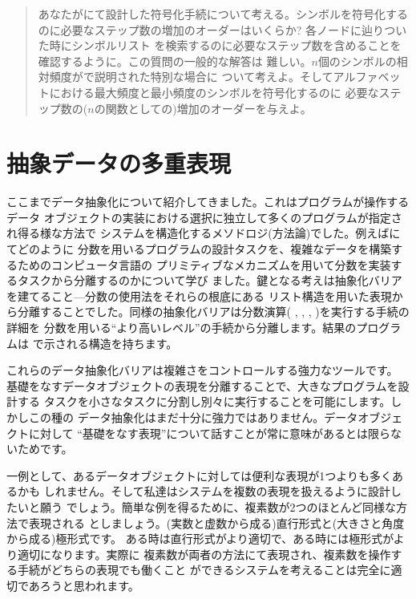 \begin{quote}
あなたがにて設計した符号化手続について考える。シンボルを符号化する
のに必要なステップ数の増加のオーダーはいくらか? 各ノードに辿りついた時にシンボルリスト
を検索するのに必要なステップ数を含めることを確認するように。この質問の一般的な解答は
難しい。\( n \)個のシンボルの相対頻度がで説明された特別な場合に
ついて考えよ。そしてアルファベットにおける最大頻度と最小頻度のシンボルを符号化するのに
必要なステップ数の(\( n \)の関数としての)増加のオーダーを与えよ。
\end{quote}

\section{抽象データの多重表現}
\label{Section 2.4}

ここまでデータ抽象化について紹介してきました。これはプログラムが操作するデータ
オブジェクトの実装における選択に独立して多くのプログラムが指定され得る様な方法で
システムを構造化するメソドロジ(方法論)でした。例えばにてどのように
分数を用いるプログラムの設計タスクを、複雑なデータを構築するためのコンピュータ言語の
プリミティブなメカニズムを用いて分数を実装するタスクから分離するのかについて学び
ました。鍵となる考えは抽象化バリアを建てること---分数の使用法をそれらの根底にある
リスト構造を用いた表現から分離することでした。同様の抽象化バリアは分数演算(
, , , )を実行する手続の詳細を
分数を用いる``より高いレベル''の手続から分離します。結果のプログラムは
で示される構造を持ちます。

これらのデータ抽象化バリアは複雑さをコントロールする強力なツールです。
基礎をなすデータオブジェクトの表現を分離することで、大きなプログラムを設計する
タスクを小さなタスクに分割し別々に実行することを可能にします。しかしこの種の
データ抽象化はまだ十分に強力ではありません。データオブジェクトに対して
``基礎をなす表現''について話すことが常に意味があるとは限らないためです。



一例として、あるデータオブジェクトに対しては便利な表現が1つよりも多くあるかも
しれません。そして私達はシステムを複数の表現を扱えるように設計したいと願う
でしょう。簡単な例を得るために、複素数が2つのほとんど同様な方法で表現される
としましょう。(実数と虚数から成る)直行形式と(大きさと角度から成る)極形式です。
ある時は直行形式がより適切で、ある時には極形式がより適切になります。実際に
複素数が両者の方法にて表現され、複素数を操作する手続がどちらの表現でも働くこと
ができるシステムを考えることは完全に適切であろうと思われます。



